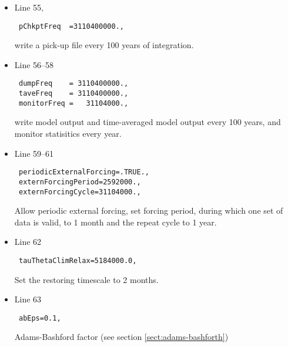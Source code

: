 {\begin{itemize}
\item Line 55,
\begin{verbatim}
 pChkptFreq  =3110400000.,
\end{verbatim}
write a pick-up file every 100 years of integration.

\item Line 56--58
\begin{verbatim}
 dumpFreq    = 3110400000.,
 taveFreq    = 3110400000.,
 monitorFreq =   31104000.,
\end{verbatim}
  write model output and time-averaged model output every 100 years,
  and monitor statisitics every year.

\item Line 59--61
\begin{verbatim}
 periodicExternalForcing=.TRUE.,
 externForcingPeriod=2592000.,
 externForcingCycle=31104000.,
\end{verbatim}
  Allow periodic external forcing, set forcing period, during which
  one set of data is valid, to 1 month and the repeat cycle to 1 year.\\
\item Line 62
\begin{verbatim}
 tauThetaClimRelax=5184000.0,
\end{verbatim}
  Set the restoring timescale to 2 months.\\

\item Line 63
\begin{verbatim}
 abEps=0.1,
\end{verbatim}
  Adams-Bashford factor (see section \ref{sect:adams-bashforth})


\end{itemize}}
